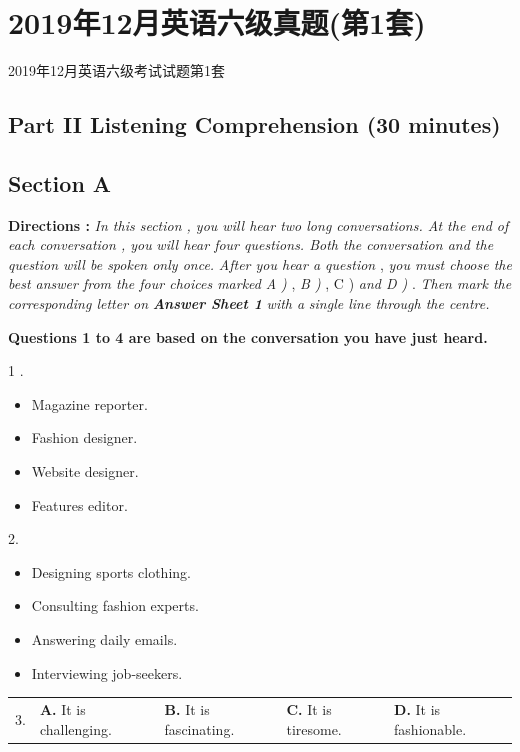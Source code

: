 \documentclass[UTF8,11pt]{ctexart}
\begin{document}
\section*{2019年12月英语六级真题(第1套)}
2019年12月英语六级考试试题第1套


\subsection*{\textbf{Part II} \textbf{Listening Comprehension} \textbf{(30 minutes)}}


\subsection*{\textbf{Section A}}


\textbf{Directions : }\textit{In this section , you will hear two long conversations. At the end of each conversation , you} \textit{will hear four questions. Both the conversation and the question will be spoken only once.} \textit{After you hear a question }, \textit{you must choose the best answer from the four choices marked} \textit{A ) }, \textit{B ) }, C ) \textit{and D ) }. \textit{Then mark the corresponding letter on }\textbf{\textit{Answer Sheet 1 }}\textit{with a} \textit{single line through the centre.}


\textbf{Questions 1 to 4 are based on the conversation you have just heard.}


1 .


\begin{itemize}[leftmargin=2em,itemsep=.2em,topsep=.4em]\item[A.] Magazine reporter.
\item[B.] Fashion designer.
\item[C.] Website designer.
\item[D.] Features editor.
\end{itemize}

2.


\begin{itemize}[leftmargin=2em,itemsep=.2em,topsep=.4em]\item[A.] Designing sports clothing.
\item[B.] Consulting fashion experts.
\item[C.] Answering daily emails.
\item[D.] Interviewing job-seekers.
\end{itemize}

\noindent\begin{tabularx}{\linewidth}{@{}lXXXX@{}}3. & \textbf{A.} It is challenging. & \textbf{B.} It is fascinating. & \textbf{C.} It is tiresome. & \textbf{D.} It is fashionable.\\\end{tabularx}\par
\end{document}
